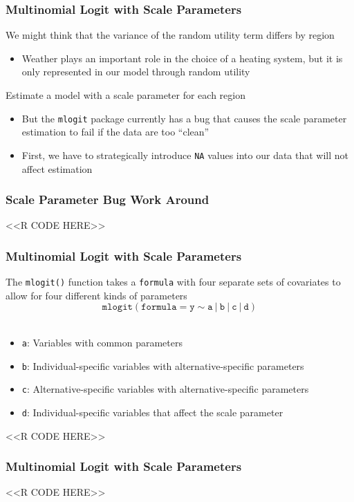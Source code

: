\documentclass{beamer}
\begin{document}
\begin{frame}\frametitle{Multinomial Logit with Scale Parameters}
    We might think that the variance of the random utility term differs by region
    \begin{itemize}
    	\item Weather plays an important role in the choice of a heating system, but it is only represented in our model through random utility
    \end{itemize}
    \vspace{2ex}
    Estimate a model with a scale parameter for each region
    \begin{itemize}
    	\item But the \texttt{mlogit} package currently has a bug that causes the scale parameter estimation to fail if the data are too ``clean''
    	\item First, we have to strategically introduce \texttt{NA} values into our data that will not affect estimation
    \end{itemize}
\end{frame}

\begin{frame}[fragile]\frametitle{Scale Parameter Bug Work Around}
    <<R CODE HERE>>
\end{frame}

\begin{frame}[fragile]\frametitle{Multinomial Logit with Scale Parameters}
     The \texttt{mlogit()} function takes a \texttt{formula} with four separate sets of covariates to allow for four different kinds of parameters
    $$\mathtt{mlogit(formula = y \sim a ~|~ b ~|~ c ~|~ d)}$$ \\
    \begin{itemize}
    	\item \texttt{a}: Variables with common parameters
    	\item \texttt{b}: Individual-specific variables with alternative-specific parameters
    	\item \texttt{c}: Alternative-specific variables with alternative-specific parameters
    	\item \texttt{d}: Individual-specific variables that affect the scale parameter
    \end{itemize}
    <<R CODE HERE>>
\end{frame}

\begin{frame}[fragile]\frametitle{Multinomial Logit with Scale Parameters}
    \vspace{0.5ex}
    <<R CODE HERE>>
\end{frame}
\end{document}
